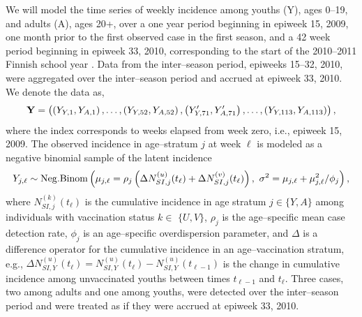 We will model the time series of weekly incidence among youths (Y), ages 0--19, and adults (A), ages 20+, over a one year period beginning in epiweek 15, 2009, one month prior to the first observed case in the first season, and a 42 week period beginning in epiweek 33, 2010, corresponding to the start of the 2010--2011 Finnish school year \cite{calendarFinland}. Data from the inter--season period, epiweeks 15--32, 2010, were aggregated over the inter--season period and accrued at epiweek 33, 2010. We denote the data as, $$ \mathbf{Y} = \left (\left (Y_{Y,1},Y_{A,1}\right ),\dots,\left (Y_{Y,52},Y_{A,52}\right ),\left (Y^\prime_{Y,71},Y^\prime_{A,71}\right ),\dots,\left (Y_{Y,113},Y_{A,113}\right )\right ), $$ where the index corresponds to weeks elapsed from week zero, i.e., epiweek 15, 2009. The observed incidence in age--stratum $ j $ at week $ \ell $ is modeled as a negative binomial sample of the latent incidence \begin{equation}
\label{flu_emit_prob}
Y_{j,\ell} \sim \mr{Neg.Binom}\left (\mu_{j,\ell} = \rho_j\left (\Delta N_{SI,j}^{(u)}(t_\ell) + \Delta N_{SI,j}^{(v)}(t_\ell)\right ),\ \sigma^2 = \mu_{j,\ell} + \mu_{j,\ell}^2 / \phi_j\right ),
\end{equation}
where $ N_{SI,j}^{(k)}(t_\ell) $ is the cumulative incidence in age stratum $ j \in\lbrace Y,A\rbrace $ among individuals with vaccination status $ k\in $ $\lbrace U,V \rbrace $, $ \rho_j $ is the age--specific mean case detection rate, $ \phi_j $ is an age--specific overdispersion parameter, and $ \Delta $ is a difference operator for the cumulative incidence in an age--vaccination stratum, e.g., $ \Delta N_{SI,Y}^{(u)}(t_\ell) = N_{SI,Y}^{(u)}(t_\ell) - N_{SI,Y}^{(u)}(t_{\ell-1}) $ is the change in cumulative incidence among unvaccinated youths between times $ t_{\ell-1} $ and $ t_\ell $. Three cases, two among adults and one among youths, were detected over the inter--season period and were treated as if they were accrued at epiweek 33, 2010. 

